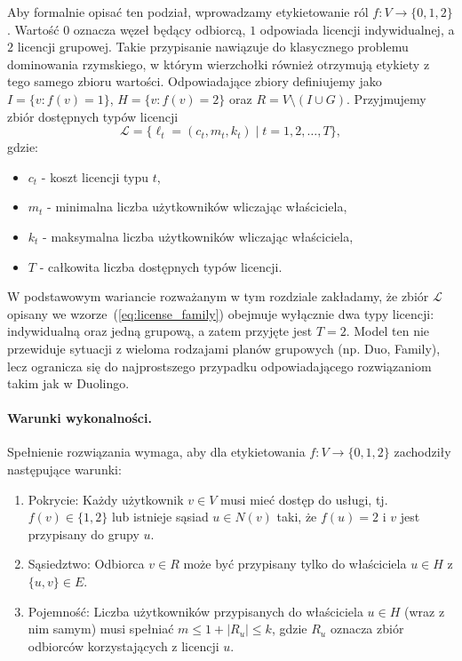 Aby formalnie opisać ten podział, wprowadzamy etykietowanie ról $f:V\to\{0,1,2\}$.
Wartość $0$ oznacza węzeł będący odbiorcą, $1$ odpowiada licencji indywidualnej, a $2$ licencji grupowej.
Takie przypisanie nawiązuje do klasycznego problemu dominowania rzymskiego, w którym wierzchołki również otrzymują etykiety z tego samego zbioru wartości.
Odpowiadające zbiory definiujemy jako $I=\{v:f(v)=1\}$, $H=\{v:f(v)=2\}$ oraz $R=V\setminus(I\cup G)$.
Przyjmujemy zbiór dostępnych typów licencji
\begin{equation}
  \mathcal{L} = \{ \ell_t = (c_t, m_t, k_t) \mid t = 1,2,\dots,T \},
  \label{eq:license_family}
\end{equation}
gdzie:
\begin{itemize}
  \item $c_t$ - koszt licencji typu $t$,
  \item $m_t$ - minimalna liczba użytkowników wliczając właściciela,
  \item $k_t$ - maksymalna liczba użytkowników wliczając właściciela,
  \item $T$ - całkowita liczba dostępnych typów licencji.
\end{itemize}
W podstawowym wariancie rozważanym w tym rozdziale zakładamy, że zbiór $\mathcal{L}$ opisany we wzorze~(\ref{eq:license_family}) obejmuje wyłącznie dwa typy licencji: indywidualną oraz jedną grupową, a zatem przyjęte jest $T = 2$. Model ten nie przewiduje sytuacji z wieloma rodzajami planów grupowych (np. Duo, Family), lecz ogranicza się do najprostszego przypadku odpowiadającego rozwiązaniom takim jak w Duolingo.

\paragraph{Warunki wykonalności.}
Spełnienie rozwiązania wymaga, aby dla etykietowania $f:V\to\{0,1,2\}$ zachodziły następujące warunki:
\begin{enumerate}
  \item Pokrycie: Każdy użytkownik $v \in V$ musi mieć dostęp do usługi, tj. $f(v)\in\{1,2\}$ lub istnieje sąsiad $u\in N(v)$ taki, że $f(u)=2$ i $v$ jest przypisany do grupy $u$.
  \item Sąsiedztwo: Odbiorca $v\in R$ może być przypisany tylko do właściciela $u\in H$ z $\{u,v\}\in E$.
  \item Pojemność: Liczba użytkowników przypisanych do właściciela $u\in H$ (wraz z nim samym) musi spełniać $m \le 1+|R_u| \le k$, gdzie $R_u$ oznacza zbiór odbiorców korzystających z licencji $u$.
\end{enumerate}


